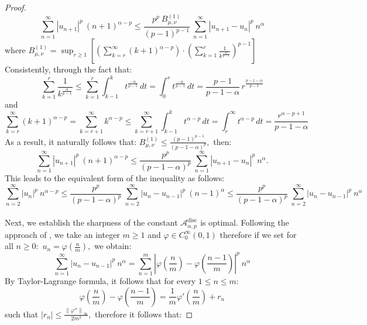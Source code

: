 \documentclass[11pt]{amsart}
\newcommand{\1}{[1]}
\def\phi{\varphi}
\begin{document}
\begin{proof}
$$
\sum_{n=1}^{\infty} |u_{n+1}|^{p} \ (n+1)^{\alpha-p} \leq \frac{p^{p} \ B_{\mu,\nu}^{(1)}}{(p-1)^{p-1}}  \ \sum_{n=1}^{\infty} |u_{n+1}-u_{n}|^{p} \ n^{\alpha}  $$
where $ \displaystyle B_{\mu,\nu}^{(1)} = \sup_{r \geq 1} \left[ \left( \sum_{k=r}^{\infty} (k+1)^{\alpha-p} \right) \cdot \left( \sum_{k=1}^{r} \frac{1}{k^{\frac{\alpha}{p-1}}} \right)^{p-1} \right]$ Consistently, through the fact that:
$$\sum_{k=1}^{r} \frac{1}{k^{\frac{\alpha}{p-1}}} \leq \sum_{k=1}^{r} \int_{k-1}^{k} t^{\frac{-\alpha}{p-1}} \, dt =  \int_{0}^{r} t^{\frac{-\alpha}{p-1}} \, dt = \frac{p-1}{p-1-\alpha} \, r^{\frac{p-1-\alpha}{p-1}}
$$
and 
$$\sum_{k=r}^{\infty} (k+1)^{\alpha-p}
=\sum_{k=r+1}^{\infty} k^{\alpha-p}
\leq \sum_{k=r+1}^{\infty} \int_{k-1}^{k} t^{\alpha-p}\,dt = \int_{r}^{\infty} t^{\alpha-p}\,dt
=\frac{r^{\alpha-p+1}}{p-1-\alpha}
$$
As a result, it naturally follows that: $B_{\mu,\nu}^{(1)} \leq \frac{(p-1)^{p-1}} {(p-1-\alpha)^p},$ then:
$$
\sum_{n=1}^{\infty} |u_{n+1}|^{p} \ (n+1)^{\alpha-p} \leq \frac{p^{p}}{(p-1-\alpha)^p}  \ \sum_{n=1}^{\infty} |u_{n+1}-u_{n}|^{p} \ n^{\alpha}. 
$$
This leads to the equivalent form of the inequality as follows: \\
$$\sum_{n=2}^{\infty} |u_{n}|^{p} \ n^{\alpha-p} \leq 
\frac{p^{p}}{(p-1-\alpha)^p}  \ \sum_{n=2}^{\infty} |u_{n}-u_{n-1}|^{p} \ (n-1)^{\alpha} \leq 
\frac{p^{p}}{(p-1-\alpha)^p}  \ \sum_{n=2}^{\infty} |u_{n}-u_{n-1}|^{p} \ n^{\alpha}
$$
\phantom{.}\\ 
Next, we establish the sharpness of the constant $\mathcal{A}^{\text{disc}}_{\alpha,p} $ is optimal. Following the approach of  \cite{Ye23}, we take an integer $m \geq 1$ and $\phi \in C^{\infty}_{0} (0,1)$ therefore if we set for all $n\geq 0:$ $u_{n}= \phi(\frac{n}{m}),$ we obtain:
$$\sum_{n=1}^{\infty} |u_{n}-u_{n-1}|^{p} \ n^{\alpha} = \sum_{n=1}^{m} \left|\phi\left(\frac{n}{m}\right)-\phi\left(\frac{n-1}{m}\right) \right|^{p} \ n^{\alpha} 
$$
By Taylor-Lagrange formula, it follows that for every $1\leq n \leq m$:
$$\phi\left(\frac{n}{m}\right)-\phi\left(\frac{n-1}{m}\right) = \frac{1}{m} \phi'\left(\frac{n}{m}\right) + r_{n} $$
such that $|r_n| \leq \frac{ \left\|\phi'' \right\|_{\infty}}{2m^2},$ therefore it follows that:


\end{proof}
\end{document}
